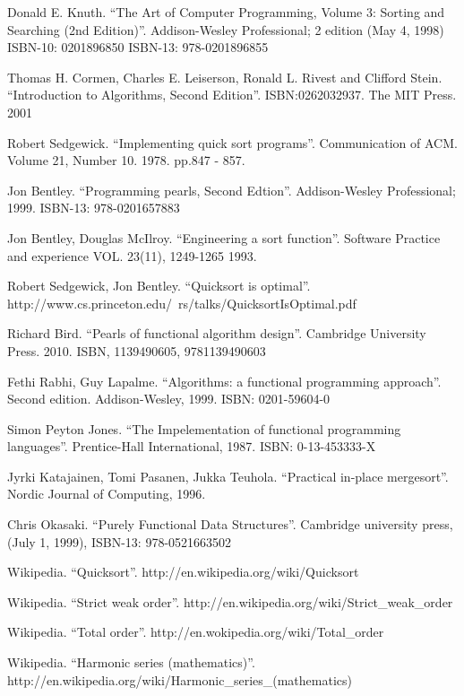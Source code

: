 \documentclass{article}
\begin{document}
\begin{thebibliography}{99}

Donald E. Knuth. ``The Art of Computer Programming, Volume 3: Sorting and Searching (2nd Edition)''. Addison-Wesley Professional; 2 edition (May 4, 1998) ISBN-10: 0201896850 ISBN-13: 978-0201896855

Thomas H. Cormen, Charles E. Leiserson, Ronald L. Rivest and Clifford Stein. 
``Introduction to Algorithms, Second Edition''. ISBN:0262032937. The MIT Press. 2001

Robert Sedgewick. ``Implementing quick sort programs''. Communication of ACM. Volume 21, Number 10. 1978. pp.847 - 857.

Jon Bentley. ``Programming pearls, Second Edtion''. Addison-Wesley Professional; 1999. ISBN-13: 978-0201657883

Jon Bentley, Douglas McIlroy. ``Engineering a sort function''. Software Practice and experience VOL. 23(11), 1249-1265 1993.

Robert Sedgewick, Jon Bentley. ``Quicksort is optimal''. http://www.cs.princeton.edu/~rs/talks/QuicksortIsOptimal.pdf

Richard Bird. ``Pearls of functional algorithm design''. Cambridge University Press. 2010. ISBN, 1139490605, 9781139490603

Fethi Rabhi, Guy Lapalme. ``Algorithms: a functional programming approach''. Second edition. Addison-Wesley, 1999. ISBN: 0201-59604-0

Simon Peyton Jones. ``The Impelementation of functional programming languages''. Prentice-Hall International, 1987. ISBN: 0-13-453333-X

Jyrki Katajainen, Tomi Pasanen, Jukka Teuhola. ``Practical in-place mergesort''. Nordic Journal of Computing, 1996.

Chris Okasaki. ``Purely Functional Data Structures''. Cambridge university press, (July 1, 1999), ISBN-13: 978-0521663502

Wikipedia. ``Quicksort''. http://en.wikipedia.org/wiki/Quicksort

Wikipedia. ``Strict weak order''. http://en.wikipedia.org/wiki/Strict\_weak\_order

Wikipedia. ``Total order''. http://en.wokipedia.org/wiki/Total\_order

Wikipedia. ``Harmonic series (mathematics)''. http://en.wikipedia.org/wiki/Harmonic\_series\_(mathematics)

\end{thebibliography}

\ifx\wholebook\relax\else
\end{document}

